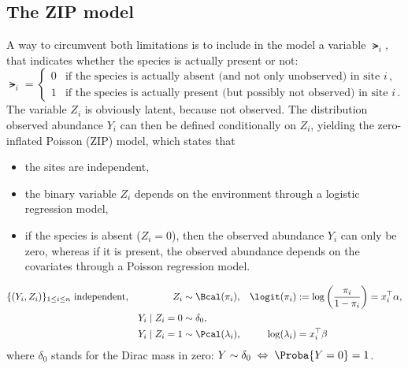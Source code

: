 \subsection{The ZIP model}
A way to circumvent both limitations is to include in the model a variable $\lat_i$, that indicates whether the species is actually present or not:
$$
\lat_i = \left\{\begin{array}{ll}
              0 & \text{if the species is actually absent (and not only unobserved) in site $i$}\,, \\
              1 & \text{if the species is actually present (but possibly not observed) in site $i$}\,. 
            \end{array}\right.
$$
The variable $Z_i$ is obviously latent, because not observed. The distribution observed abundance $Y_i$ can then be defined conditionally on $Z_i$, yielding the zero-inflated Poisson (ZIP) model, which states that 
\begin{itemize}
  \item the sites are independent, 
  \item the binary variable $Z_i$ depends on the environment through a logistic regression model,
  \item if the species is absent ($Z_i = 0$), then the observed abundance $Y_i$ can only be zero, whereas if it is present, the observed abundance depends on the covariates through a Poisson regression model.
\end{itemize}
\begin{model} \label{mod:zip}
  \begin{align*} 
    \{(Y_i, Z_i)\}_{1 \leq i \leq n} & \text{ independent}, & 
    Z_i & \sim \Bcal(\pi_i), & 
    \logit(\pi_i) & := \log\left(\frac{\pi_i}{1 - \pi_i}\right) = x_i^\top \alpha, 
    \nonumber \\
    & & Y_i \mid Z_i = 0 & \sim \delta_0, \\
    & & Y_i \mid Z_i = 1 & \sim \Pcal(\lambda_i), & 
    \log(\lambda_i) &  = x_i^\top \beta \nonumber 
  \end{align*}
  where $\delta_0$ stands for the Dirac mass in zero: $Y \sim \delta_0 \; \Leftrightarrow \; \Proba{Y = 0} = 1$.
\end{model}

